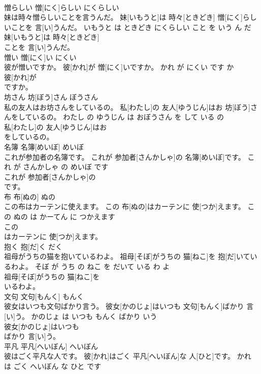 \documentclass[8pt]{extreport}
\begin{document}
\begin{CJK}{UTF8}{min}
\\	憎らしい	憎[にく]らしい	にくらしい	
\\	妹は時々憎らしいことを言うんだ。	妹[いもうと]は 時々[ときどき] 憎[にく]らしいことを 言[い]うんだ。	いもうと は ときどき にくらしい こと を いう ん だ	
\\	妹[いもうと]は 時々[ときどき]
\\	ことを 言[い]うんだ。			
\\	憎い	憎[にく]い	にくい	
\\	彼が憎いですか。	彼[かれ]が 憎[にく]いですか。	かれ が にくい です か	
\\	彼[かれ]が
\\	ですか。			
\\	坊さん	坊[ぼう]さん	ぼうさん	
\\	私の友人はお坊さんをしているの。	私[わたし]の 友人[ゆうじん]はお 坊[ぼう]さんをしているの。	わたし の ゆうじん は おぼうさん を して いる の	
\\	私[わたし]の 友人[ゆうじん]はお
\\	をしているの。			
\\	名簿	名簿[めいぼ]	めいぼ	
\\	これが参加者の名簿です。	これが 参加者[さんかしゃ]の 名簿[めいぼ]です。	これ が さんかしゃ の めいぼ です	
\\	これが 参加者[さんかしゃ]の
\\	です。			
\\	布	布[ぬの]	ぬの	
\\	この布はカーテンに使えます。	この 布[ぬの]はカーテンに 使[つか]えます。	この ぬの は かーてん に つかえます	
\\	この
\\	はカーテンに 使[つか]えます。			
\\	抱く	抱[だ]く	だく	
\\	祖母がうちの猫を抱いているわよ。	祖母[そぼ]がうちの 猫[ねこ]を 抱[だ]いているわよ。	そぼ が うち の ねこ を だいて いる わ よ	
\\	祖母[そぼ]がうちの 猫[ねこ]を
\\	いるわよ。			
\\	文句	文句[もんく]	もんく	
\\	彼女はいつも文句ばかり言う。	彼女[かのじょ]はいつも 文句[もんく]ばかり 言[い]う。	かのじょ は いつも もんく ばかり いう	
\\	彼女[かのじょ]はいつも
\\	ばかり 言[い]う。			
\\	平凡	平凡[へいぼん]	へいぼん	
\\	彼はごく平凡な人です。	彼[かれ]はごく 平凡[へいぼん]な 人[ひと]です。	かれ は ごく へいぼん な ひと です	

\end{CJK}
\end{document}
